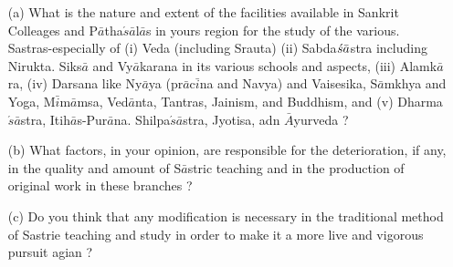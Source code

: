 {\begin{itemize}
\begin{itemize}
                 \item[(a)] What is the nature and extent of the facilities available in Sankrit Colleages and P$\bar{a}$tha$\acute{s}\bar{a}$l$\bar{a}$s in yours region for the study of the various. Sastras-especially of (i) Veda (including Srauta) (ii) Sabda$\acute{s}\bar{a}\- $stra including Nirukta. Siks$\bar{a}$ and Vy$\bar{a}$karana in its various schools and aspects, (iii) Alamk$\bar{a}$ra, (iv) Darsana like Ny$\bar{a}$ya (pr$\bar{a}$c$\bar{i}$na and Navya) and Vaisesika, S$\bar{a}$mkhya and Yoga, M$\bar{i}$m$\bar{a}$msa, Ved$\bar{a}$nta, Tantras, Jainism, and Buddhism, and (v) Dharma$\acute{s}\bar{a}$stra, Itih$\bar{a}$s-Pur$\bar{a}$na. Shilpa$\acute{s}\bar{a}$stra, Jyotisa, adn $\bar{A}$yurveda ?
                 
                 \item[(b)] What factors, in your opinion, are responsible for the deterioration, if any, in the quality and amount of S$\bar{a}$stric teaching and in the production of original work in these branches ?
                 
  \item[(c)] Do you think that any modification is necessary in the traditional method of Sastrie teaching and study in order to make it a more live and vigorous pursuit agian ?
\end{itemize}
\end{itemize}
}


